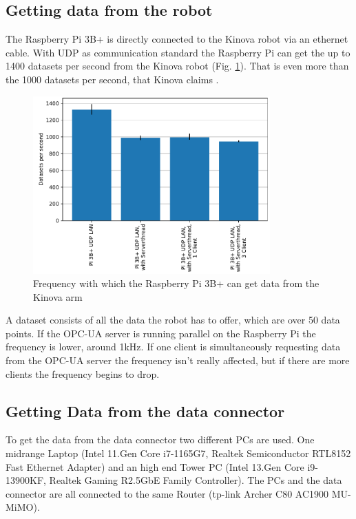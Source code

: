 \documentclass[conference]{IEEEtran}
\begin{document}
\subsection{Getting data from the robot}
The Raspberry Pi 3B+ is directly connected to the Kinova robot via an ethernet cable.
With UDP as communication standard the Raspberry Pi can get the up to 1400 datasets per second from the Kinova robot (Fig. \ref{fig:KortexAPISpeed}).
That is even more than the 1000 datasets per second, that Kinova claims \cite{KortexUDP}.\\

\begin{figure}[htbp]
    \centerline{\includegraphics[width=9.1cm]{Pictures/KortexAPISpeed.pdf}}
    \caption{Frequency with which the Raspberry Pi 3B+ can get data from the Kinova arm}
    \label{fig:KortexAPISpeed}
\end{figure}
A dataset consists of all the data the robot has to offer, which are over 50 data points.
If the OPC-UA server is running parallel on the Raspberry Pi the frequency is lower, around 1kHz.
If one client is simultaneously requesting data from the OPC-UA server the frequency isn't really affected, but if there are more clients the frequency begins to drop.
\subsection{Getting Data from the data connector}
To get the data from the data connector two different PCs are used. One midrange Laptop (Intel 11.Gen Core i7-1165G7, Realtek Semiconductor
RTL8152 Fast Ethernet Adapter) and an high end Tower PC (Intel 13.Gen Core i9-13900KF, Realtek Gaming R2.5GbE Family Controller).
The PCs and the data connector are all connected to the same Router (tp-link Archer C80 AC1900 MU-MiMO).\\
\end{document}
